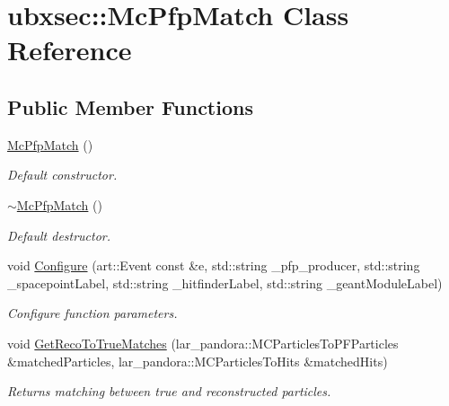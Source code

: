 \hypertarget{classubxsec_1_1McPfpMatch}{\section{ubxsec\-:\-:\-Mc\-Pfp\-Match \-Class \-Reference}
\label{classubxsec_1_1McPfpMatch}
}
\subsection*{\-Public \-Member \-Functions}
\begin{DoxyCompactItemize}
\item 
\hypertarget{classubxsec_1_1McPfpMatch_aea3e9923fdf8855d5798015b36f2d516}{\hyperlink{classubxsec_1_1McPfpMatch_aea3e9923fdf8855d5798015b36f2d516}{\-Mc\-Pfp\-Match} ()}\label{classubxsec_1_1McPfpMatch_aea3e9923fdf8855d5798015b36f2d516}

\begin{DoxyCompactList}\small\item\em \-Default constructor. \end{DoxyCompactList}\item 
\hypertarget{classubxsec_1_1McPfpMatch_a3fa822d7321aca21a0ad42e692a29bf2}{\hyperlink{classubxsec_1_1McPfpMatch_a3fa822d7321aca21a0ad42e692a29bf2}{$\sim$\-Mc\-Pfp\-Match} ()}\label{classubxsec_1_1McPfpMatch_a3fa822d7321aca21a0ad42e692a29bf2}

\begin{DoxyCompactList}\small\item\em \-Default destructor. \end{DoxyCompactList}\item 
\hypertarget{classubxsec_1_1McPfpMatch_a15cea806e5a1b12bf2e187d5d26c528d}{void \hyperlink{classubxsec_1_1McPfpMatch_a15cea806e5a1b12bf2e187d5d26c528d}{\-Configure} (art\-::\-Event const \&e, std\-::string \-\_\-pfp\-\_\-producer, std\-::string \-\_\-spacepoint\-Label, std\-::string \-\_\-hitfinder\-Label, std\-::string \-\_\-geant\-Module\-Label)}\label{classubxsec_1_1McPfpMatch_a15cea806e5a1b12bf2e187d5d26c528d}

\begin{DoxyCompactList}\small\item\em \-Configure function parameters. \end{DoxyCompactList}\item 
void \hyperlink{classubxsec_1_1McPfpMatch_a1b66ef44f3a1772a4e72de2e5066768c}{\-Get\-Reco\-To\-True\-Matches} (lar\-\_\-pandora\-::\-M\-C\-Particles\-To\-P\-F\-Particles \&matched\-Particles, lar\-\_\-pandora\-::\-M\-C\-Particles\-To\-Hits \&matched\-Hits)
\begin{DoxyCompactList}\small\item\em \-Returns matching between true and reconstructed particles. \end{DoxyCompactList}\end{DoxyCompactItemize}

